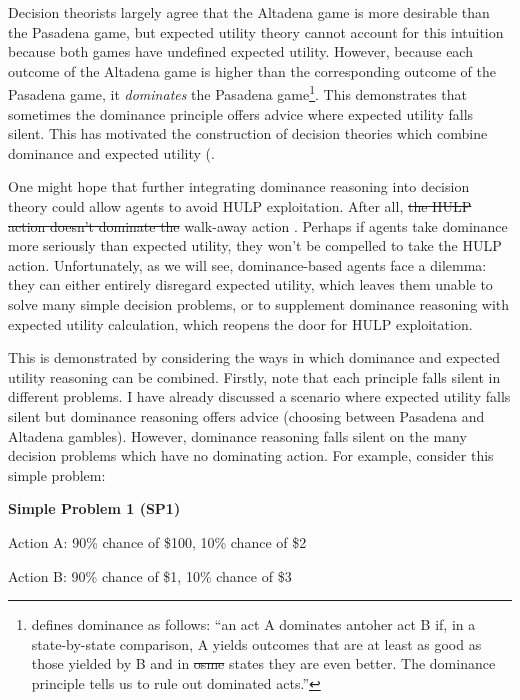 \documentclass{article}
\providecommand{\DIFadd}[1]{{\protect\color{blue}\uwave{#1}}} %
\providecommand{\DIFdel}[1]{{\protect\color{red}\sout{#1}}}                      %
\providecommand{\DIFaddbegin}{} %
\providecommand{\DIFaddend}{} %
\providecommand{\DIFdelbegin}{} %
\providecommand{\DIFdelend}{} %
\begin{document}
Decision theorists largely agree that the Altadena game is more desirable than the Pasadena game, but expected utility theory cannot account for this intuition because both games have undefined expected utility. However, because each outcome of the Altadena game is higher than the corresponding outcome of the Pasadena game, it \textit{dominates} the Pasadena game\footnote{\citep[pg. 9]{resnik1987choices} defines dominance as follows: ``an act A dominates antoher act B if, in a state-by-state comparison, A yields outcomes that are at least as good as those yielded by B and in \DIFdelbegin \DIFdel{osme }\DIFdelend \DIFaddbegin \DIFadd{some }\DIFaddend states they are even better. The dominance principle tells us to rule out dominated acts.''}. This demonstrates that sometimes the dominance principle offers advice where expected utility falls silent. This has motivated the construction of decision theories which combine dominance and expected utility (\citep{easwaran2009dominance, colyvan2008relative, colyvan2006no}.

One might hope that further integrating dominance reasoning into decision theory could allow agents to avoid HULP exploitation. After all, \DIFdelbegin \DIFdel{the HULP action doesn't dominate the }\DIFdelend \DIFaddbegin \DIFadd{neither HULP nor }\DIFaddend walk-away action \DIFaddbegin \DIFadd{dominates the other}\DIFaddend . Perhaps if agents take dominance more seriously than expected utility, they won't be compelled to take the HULP action. Unfortunately, as we will see, dominance-based agents face a dilemma: they can either entirely disregard expected utility, which leaves them unable to solve many simple decision problems, or to supplement dominance reasoning with expected utility calculation, which reopens the door for HULP exploitation.

This is demonstrated by considering the ways in which dominance and expected utility reasoning can be combined. Firstly, note that each principle falls silent in different problems. I have already discussed a scenario where expected utility falls silent but dominance reasoning offers advice (choosing between Pasadena and Altadena gambles). However, dominance reasoning falls silent on the many decision problems which have no dominating action. For example, consider this simple problem:

\begin{center}
\textbf{Simple Problem 1 (SP1)}

Action A: 90\% chance of \$100, 10\% chance of \$2

Action B: 90\% chance of \$1, 10\% chance of \$3
\end{center}
\end{document}
